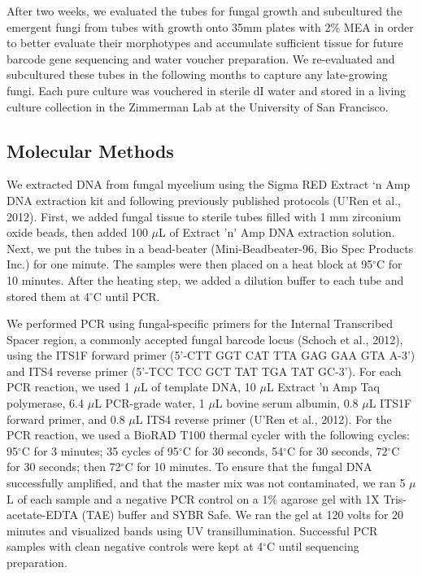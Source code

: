 \documentclass[fleqn,10pt,lineno]{wlpeerj} %
\begin{document}
After two weeks, we evaluated the tubes for fungal growth and subcultured the emergent fungi from tubes with growth onto 35mm plates with 2\% MEA in order to better evaluate their morphotypes and accumulate sufficient tissue for future barcode gene sequencing and water voucher preparation. We re-evaluated and subcultured these tubes in the following months to capture any late-growing fungi. Each pure culture was vouchered in sterile dI water and stored in a living culture collection in the Zimmerman Lab at the University of San Francisco.

\hypertarget{molecular-methods}{%
\subsection*{Molecular Methods}\label{molecular-methods}}

We extracted DNA from fungal mycelium using the Sigma RED Extract `n Amp DNA extraction kit and following previously published protocols (U'Ren et al., 2012). First, we added fungal tissue to sterile tubes filled with 1 mm zirconium oxide beads, then added 100 \(\mu\)L of Extract 'n' Amp DNA extraction solution. Next, we put the tubes in a bead-beater (Mini-Beadbeater-96, Bio Spec Products Inc.) for one minute. The samples were then placed on a heat block at 95\(^{\circ}\)C for 10 minutes. After the heating step, we added a dilution buffer to each tube and stored them at 4\(^{\circ}\)C until PCR.

We performed PCR using fungal-specific primers for the Internal Transcribed Spacer region, a commonly accepted fungal barcode locus (Schoch et al., 2012), using the ITS1F forward primer (5'-CTT GGT CAT TTA GAG GAA GTA A-3') and ITS4 reverse primer (5'-TCC TCC GCT TAT TGA TAT GC-3'). For each PCR reaction, we used 1 \(\mu\)L of template DNA, 10 \(\mu\)L Extract 'n Amp Taq polymerase, 6.4 \(\mu\)L PCR-grade water, 1 \(\mu\)L bovine serum albumin, 0.8 \(\mu\)L ITS1F forward primer, and 0.8 \(\mu\)L ITS4 reverse primer (U'Ren et al., 2012). For the PCR reaction, we used a BioRAD T100 thermal cycler with the following cycles: 95\(^{\circ}\)C for 3 minutes; 35 cycles of 95\(^{\circ}\)C for 30 seconds, 54\(^{\circ}\)C for 30 seconds, 72\(^{\circ}\)C for 30 seconds; then 72\(^{\circ}\)C for 10 minutes. To ensure that the fungal DNA successfully amplified, and that the master mix was not contaminated, we ran 5 \(\mu\)L of each sample and a negative PCR control on a 1\% agarose gel with 1X Tris-acetate-EDTA (TAE) buffer and SYBR Safe. We ran the gel at 120 volts for 20 minutes and visualized bands using UV transillumination. Successful PCR samples with clean negative controls were kept at 4\(^{\circ}\)C until sequencing preparation.
\end{document}
